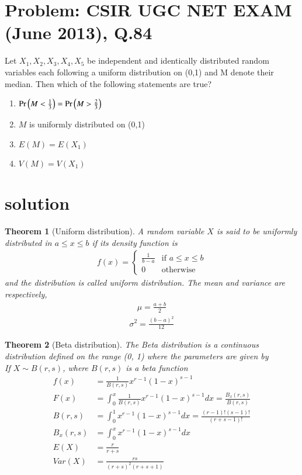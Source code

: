 \documentclass[journal,12pt,twocolumn]{IEEEtran}
\newtheorem{theorem}{Theorem}[section]
\begin{document}
\section*{Problem: CSIR UGC NET EXAM (June 2013), Q.84}
Let $X_1,X_2,X_3,X_4,X_5$ be independent and identically distributed random variables each following a uniform distribution on (0,1) and M denote their median. Then which of the following statements are true?
\begin{enumerate}
    \item $\Pr\left(M<\frac{1}{3}\right)=\Pr\left(M>\frac{2}{3}\right)$\\
    \item $M$ is uniformly distributed on (0,1)\\
    \item $E(M)=E(X_1)$\\
    \item $V(M)=V(X_1)$
\end{enumerate}
\section*{solution}


\begin{theorem}[Uniform distribution]
A random variable $X$ is said to be uniformly distributed in $a\leq x\leq b$ if its density function is
\begin{align}
    f(x)=
    \begin{cases}
    \frac{1}{b-a} & \text{if } a\leq x \leq b\\
    0 & \text{otherwise}
    \end{cases}\label{eq:1}
\end{align}
and the distribution is called uniform distribution.
The mean and variance are respectively,
\begin{align}
    \mu=\frac{a+b}{2}\label{eq:2}
\end{align}
\begin{align}
     \sigma^2=\frac{(b-a)^2}{12}\label{eq:3}
\end{align}
\label{theorem}
\end{theorem}

\begin{theorem}[Beta distribution]
The Beta distribution is a continuous distribution defined on the range
(0, 1) where the parameters are given by\\
If $X\sim B(r,s)$, where $B(r,s)$ is a beta function
\begin{align}
  \label{eq:4}  f(x)&=\frac{1}{B(r,s)}x^{r-1}(1-x)^{s-1}\\ 
    \label{eq:5}F(x)&=\int_{0}^{x}\frac{1}{B(r,s)}x^{r-1}(1-x)^{s-1}dx=\frac{B_x(r,s)}{B(r,s)}\\ 
  \label{eq:6}  B(r,s)&=\int_{0}^{1}x^{r-1}(1-x)^{s-1}dx=\frac{(r-1)!(s-1)!}{(r+s-1)!}\\ 
     \label{eq:7}B_x(r,s)&=\int_{0}^{x}x^{r-1}(1-x)^{s-1}dx\\
   \label{eq:8} E(X)&=\frac{r}{r+s}\\ 
    \label{var} Var(X)&=\frac{rs}{(r+s)^{2}(r+s+1)} 
\end{align}
\end{theorem}
\end{document}
